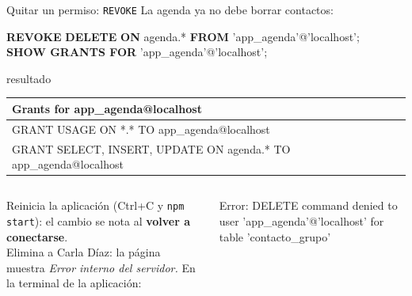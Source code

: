 \documentclass[aspectratio=169,10pt,c]{beamer}
\newcommand{\kw}[1]{\textcolor{utpRojo}{\textbf{#1}}}
\newcommand{\npieza}[1]{\tikz[baseline=-0.6ex]{\node[circle,fill=utpRojo,text=white,
  font=\bfseries\scriptsize,inner sep=1.6pt,minimum size=4.2mm] {#1};}}
\newcommand{\dentro}[1]{{\setlength{\fboxsep}{1.5pt}\colorbox{yellow!45}{#1}}}
\newenvironment{sqlchico}[1][.86\textwidth]
  {\begin{center}\begin{lrbox}{\sqlbuf}\begin{minipage}{#1}\ttfamily\scriptsize\vspace{5pt}\raggedright}
  {\vspace{5pt}\end{minipage}\end{lrbox}\colorbox{utpGrisClaro}{\usebox{\sqlbuf}}\end{center}}
\newenvironment{sqlmicro}[1][.86\textwidth]
  {\begin{center}\begin{lrbox}{\sqlbuf}\begin{minipage}{#1}\ttfamily\fontsize{6.4}{7.5}\selectfont\vspace{4pt}\raggedright}
  {\vspace{4pt}\end{minipage}\end{lrbox}\colorbox{utpGrisClaro}{\usebox{\sqlbuf}}\end{center}}
\newcommand{\col}{\dimexpr\textwidth-2\fboxsep\relax}
\newcommand{\err}[1]{\textcolor{utpRojo}{#1}}
\newcommand{\cab}[1]{\normalfont\bfseries #1}
\newcommand{\bq}{\textasciigrave{}}
\begin{document}
\begin{frame}{Quitar un permiso: \texttt{REVOKE}}
\small La agenda ya no debe borrar contactos:
\begin{sqlchico}[.82\textwidth]
\dentro{\kw{REVOKE}} \kw{DELETE} \kw{ON} agenda.* \dentro{\kw{FROM}} 'app\_agenda'@'localhost';\\[3pt]
\kw{SHOW GRANTS FOR} 'app\_agenda'@'localhost';
\end{sqlchico}
\vspace{-0.1cm}
\begin{center}
{\scriptsize\color{utpGris}resultado}\\[2pt]
{\fontsize{6.5}{7.8}\selectfont\ttfamily
\begin{tabular}{@{}l@{}}
\toprule
\cab{Grants for app\_agenda@localhost} \\
\midrule
GRANT USAGE ON *.* TO \bq app\_agenda\bq @\bq localhost\bq \\
GRANT SELECT, INSERT, UPDATE ON \bq agenda\bq .* TO \bq app\_agenda\bq @\bq localhost\bq \\
\bottomrule
\end{tabular}\par}
\end{center}
\vspace{0.1cm}
\begin{columns}[T,onlytextwidth]
\footnotesize\raggedright
\npieza{1} Reinicia la aplicación (Ctrl+C y \texttt{npm start}): el cambio se nota al \textbf{volver a conectarse}.\\[5pt]
\npieza{2} Elimina a Carla Díaz: la página muestra \textit{Error interno del servidor.}
\footnotesize En la terminal de la aplicación:
\begin{sqlmicro}[\col]
\err{Error: DELETE command denied to user 'app\_agenda'@'localhost' for table 'contacto\_grupo'}
\end{sqlmicro}
\end{columns}
\end{frame}
\end{document}
